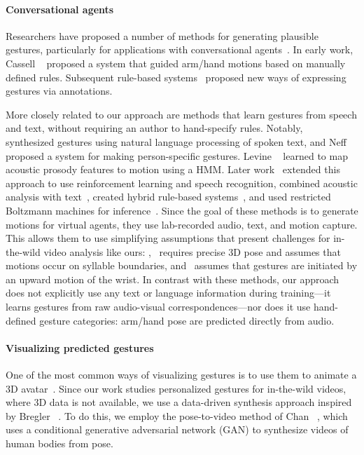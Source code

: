 \documentclass[10pt,twocolumn,letterpaper]{article}
\newcommand{\mypar}[1]{\vspace{-2mm}\paragraph{#1}}
\begin{document}
\mypar{Conversational agents} 
Researchers have proposed a number of methods for generating plausible
gestures, particularly for applications with conversational
agents~\cite{cassell2000embodied}. In early work, Cassell
\etal~\cite{Cassell-animated} proposed a system that guided arm/hand
motions based on manually defined rules. Subsequent rule-based
systems~\cite{kopp2006towards} proposed new ways of expressing
gestures via annotations. 

More closely related to our approach are
methods that learn gestures from speech and text, without requiring an
author to hand-specify rules. Notably,~\cite{cassell2004beat}
synthesized gestures using natural language processing of spoken text,
and Neff~\cite{Kipp-modelling-synthesis} proposed a system for making person-specific gestures. Levine
\etal~\cite{levine2009real} learned to map acoustic prosody features to motion using a HMM. Later
work~\cite{levine2010gesture} extended this approach to use
reinforcement learning and speech recognition, combined acoustic analysis with text~\cite{marsella2013performance}, created hybrid rule-based systems~\cite{Busso-meaningful}, and used restricted Boltzmann machines for inference~\cite{chiu2011train}. 
Since the goal of these methods is to generate motions for virtual agents, they use lab-recorded audio, text, and motion
capture. This allows them to use simplifying assumptions that present challenges for in-the-wild video analysis like ours: \eg,~\cite{levine2009real} requires precise 3D pose and assumes
that motions occur on syllable boundaries, and~\cite{chiu2011train} assumes that gestures are initiated by an upward motion of the wrist. In contrast with these methods, our approach does not explicitly use any
text or language information during training---it learns gestures from
raw audio-visual correspondences---nor does it use hand-defined
gesture categories: arm/hand pose are predicted directly from audio.


\mypar{Visualizing predicted gestures}
One of the most common ways of visualizing gestures
is to use them to animate a 3D avatar~\cite{thiebaux2008smartbody,levine2010gesture,hartholt2013all}. Since our work studies personalized gestures for in-the-wild videos, where 3D data is not available, we use a data-driven synthesis approach inspired by Bregler \etal~\cite{bregler1997video}. To do this, we employ the pose-to-video method of Chan \etal~\cite{Chan2018dance}, which uses a conditional generative adversarial network (GAN) to synthesize videos of human bodies from pose.
\end{document}

